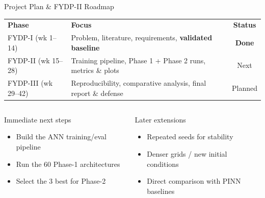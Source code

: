 \documentclass[aspectratio=169,11pt]{beamer}
\begin{document}
\begin{frame}{Project Plan \& FYDP-II Roadmap}
  \footnotesize
  \renewcommand{\arraystretch}{1.2}
  \begin{tabular}{>{\raggedright\arraybackslash}p{2.2cm} >{\raggedright\arraybackslash}p{7.4cm} c}
    \rowcolor{tealDark}
    \textbf{\color{white}Phase} & \textbf{\color{white}Focus} & \textbf{\color{white}Status}\\
    \rowcolor{tealSoft}
    FYDP-I (wk 1--14) & Problem, literature, requirements, \textbf{validated baseline} & {\color{tealDark}\textbf{Done}}\\
    FYDP-II (wk 15--28) & Training pipeline, Phase 1 + Phase 2 runs, metrics \& plots & Next\\
    \rowcolor{tealSoft}
    FYDP-III (wk 29--42) & Reproducibility, comparative analysis, final report \& defense & Planned\\
  \end{tabular}
  \vspace{0.3cm}
  \begin{columns}[t]
      \begin{card}{Immediate next steps}
        \scriptsize
        \begin{itemize}
          \item Build the ANN training/eval pipeline
          \item Run the 60 Phase-1 architectures
          \item Select the 3 best for Phase-2
        \end{itemize}
      \end{card}
      \begin{card}{Later extensions}
        \scriptsize
        \begin{itemize}
          \item Repeated seeds for stability
          \item Denser grids / new initial conditions
          \item Direct comparison with PINN baselines
        \end{itemize}
      \end{card}
  \end{columns}
\end{frame}
\end{document}
